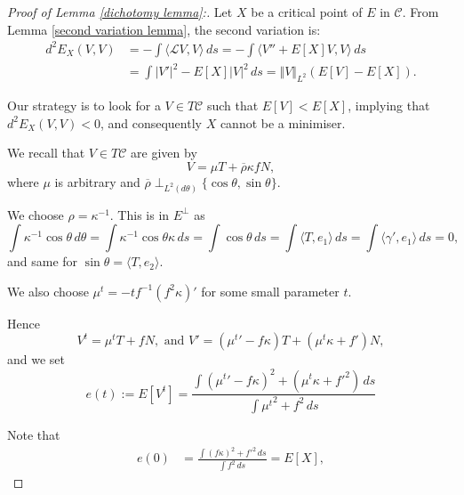 \begin{proof}[Proof of Lemma \ref{dichotomy lemma}:]
Let $X$ be a critical point of $E$ in $\mathcal{C}$.
From Lemma \ref{second variation lemma}, the  second variation %
is:
\begin{align*}d^2E_X(V,V)&=-\int\langle\mathcal{L}V, V\rangle \,ds= -\int\langle V''+ E[X]V, V\rangle \,ds\\&=  \int| V'|^2- E[X]|V|^2\,ds= \Vert V\Vert_{L^2}\left( E[V]-E[X]\right).
\end{align*}

Our strategy is to look for a $V\in T\mathcal{C}$ such that $E[V]<E[X]$, implying that $d^2E_X(V,V)<0$, and consequently $X$ cannot be a minimiser.  

We recall that $V\in T\mathcal{C}$ are given by $$V=\mu T + \overline{\rho}\kappa f N,$$ where $\mu$ is arbitrary and $\overline{\rho}\perp_{L^2(d\theta)}\lbrace\cos\theta,\sin\theta\rbrace.  $

We choose $\rho=\kappa^{-1}$.    This is in $E^\perp$ as $$\int \kappa^{-1}\cos\theta\,d\theta= \int\kappa^{-1}\cos\theta \kappa\,ds= \int \cos\theta\,ds= \int \langle T,e_1\rangle\,ds= \int \langle \gamma',e_1\rangle\,ds=0,$$
and same for $\sin\theta=\langle T, e_2\rangle$.

We  also choose $\mu^t=-{t}{f}^{-1}(f^2\kappa)'$ for some small parameter $t$.   

Hence $$V^t= \mu^t T + f N, \text{ and }V'=({\mu^t}'-f\kappa )T+ (\mu^t\kappa + f')N,$$
and we set
$$e(t):= E[V^t]= \frac{\int ({\mu^t}'-f\kappa)^2 + (\mu^t\kappa+ f'^2 )\,ds }{\int {\mu^t}^2 + f^2 \,ds }$$


Note that 
 \begin{align*} e(0)
&= \frac{\int (f\kappa)^2 + f'^2 \,ds }{\int  f^2 \,ds }= E[X],
\end{align*}


\end{proof}
